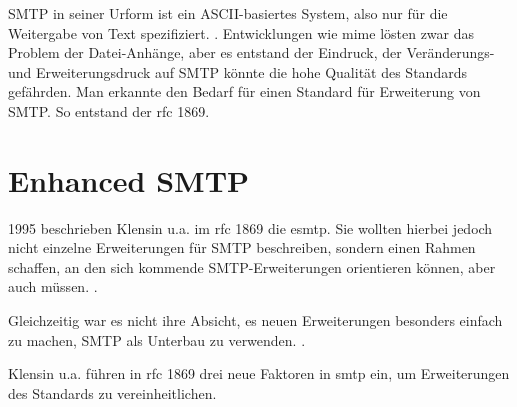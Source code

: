 SMTP in seiner Urform ist ein ASCII-basiertes System, also nur für die Weitergabe von Text spezifiziert.  \citep[][21]{rfc821}. Entwicklungen wie \ac{mime} \citep[vgl.][]{rfc1521} lösten zwar das Problem der Datei-Anhänge, aber es entstand der Eindruck, der Veränderungs- und Erweiterungsdruck auf SMTP könnte die hohe Qualität des Standards gefährden. Man erkannte den Bedarf für einen Standard für Erweiterung von SMTP. So entstand der \ac{rfc} 1869.

\section{Enhanced SMTP}

1995 beschrieben Klensin u.a. im \ac{rfc} 1869 die \ac{esmtp}.
Sie wollten hierbei jedoch nicht einzelne Erweiterungen für SMTP beschreiben, sondern einen Rahmen schaffen, an den sich kommende SMTP-Erweiterungen orientieren können, aber auch müssen.  \citep[][1]{rfc1869}. 

Gleichzeitig war es nicht ihre Absicht, es neuen Erweiterungen besonders einfach zu machen, SMTP als Unterbau zu verwenden.  \citep[][2]{rfc1869}. 

Klensin u.a. führen in \ac{rfc} 1869 drei neue Faktoren in \ac{smtp} ein, um Erweiterungen des Standards zu vereinheitlichen.

